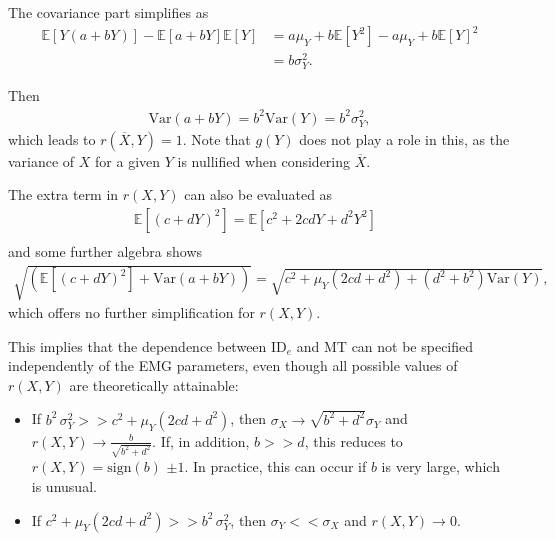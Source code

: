\documentclass[manuscript,review,anonymous]{acmart}
\newcommand{\ide}{\ensuremath{{\text{ID}_e}}\xspace}
\begin{document}
The covariance part simplifies as
\begin{align}
	\mathbb{E}[Y(a + bY)] - \mathbb{E}[a + bY]\mathbb{E}[Y] & = a \mu_Y + b\mathbb{E}[Y^2] - a\mu_Y + b\mathbb{E}[Y]^2 \\
	                                                        & = b\sigma_Y^2.
\end{align}

Then
\begin{align}
	\text{Var}(a + bY) = b^2\text{Var}(Y) = b^2\sigma_Y^2,
\end{align}
which leads to $r(\overline{X}, Y) = 1$. Note that $g(Y)$ does not play a role in this, as the variance of $X$ for a given $Y$ is nullified when considering $\overline{X}$.

The extra term in $r(X,Y)$ can also be evaluated as
\begin{align}
	\mathbb{E}[(c + dY)^2] = \mathbb{E}[c^2 + 2cdY + d^2Y^2] \text{ } \\
\end{align}
and some further algebra shows
\begin{align}
	\sqrt{(\mathbb{E}[(c + dY)^2] + \text{Var}(a + bY))} = \sqrt{c^2 + \mu_Y(2cd + d^2) + (d^2 + b^2)\text{Var}(Y)},
\end{align}
which offers no further simplification for $r(X,Y)$.


This implies that the dependence between \ide and MT can not be specified independently of the EMG parameters, even though all possible values of $r(X,Y)$ are theoretically attainable:
\begin{itemize}
	\item If $b^2\,\sigma^2_Y >> c^2 +\mu_Y(2cd + d^2)$, then $\sigma_X \to \sqrt{b^2 + d^2} \sigma_Y$ and $r(X,Y) \to \frac{b}{\sqrt{b^2 + d^2}} $. If, in addition, $b >> d$, this reduces to $r(X,Y) = \text{sign}(b)$ \ie $\pm 1$. In practice, this can occur if $b$ is very large, which is unusual.
	\item If $c^2 +\mu_Y(2cd + d^2) >> b^2\,\sigma^2_Y$, then $\sigma_Y << \sigma_X$ and $r(X,Y) \to 0$.
\end{itemize}
\end{document}
